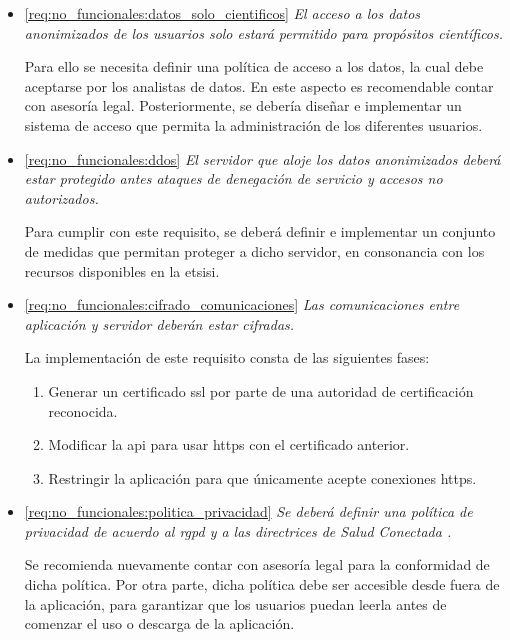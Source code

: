     \begin{itemize}
        \item \ref{req:no_funcionales:datos_solo_cientificos} \textit{El acceso a los datos anonimizados de los usuarios solo estará permitido para propósitos científicos.}
        
        Para ello se necesita definir una política de acceso a los datos, la cual debe aceptarse por los analistas de datos. En este aspecto es recomendable contar con asesoría legal. Posteriormente, se debería diseñar e implementar un sistema de acceso que permita la administración de los diferentes usuarios.
        
        \item \ref{req:no_funcionales:ddos} \textit{El servidor que aloje los datos anonimizados deberá estar protegido antes ataques de denegación de servicio y accesos no autorizados.}

        Para cumplir con este requisito, se deberá definir e implementar un conjunto de medidas que permitan proteger a dicho servidor, en consonancia con los recursos disponibles en la \gls{etsisi}.
        
        \item \ref{req:no_funcionales:cifrado_comunicaciones} \textit{Las comunicaciones entre aplicación y servidor deberán estar cifradas.}

        La implementación de este requisito consta de las siguientes fases:
        \begin{enumerate}
            \item Generar un certificado \gls{ssl} por parte de una autoridad de certificación reconocida.
            \item Modificar la \gls{api} para usar \gls{https} con el certificado anterior.
            \item Restringir la aplicación para que únicamente acepte conexiones \gls{https}.
        \end{enumerate}
        
        \item \ref{req:no_funcionales:politica_privacidad} \textit{Se deberá definir una política de privacidad de acuerdo al \gls{rgpd} \cite{publications_office_of_the_european_union_reglamento_nodate} y a las directrices de \textit{Salud Conectada} \cite{google_preguntas_nodate}.}

        Se recomienda nuevamente contar con asesoría legal para la conformidad de dicha política. Por otra parte, dicha política debe ser accesible desde fuera de la aplicación, para garantizar que los usuarios puedan leerla antes de comenzar el uso o descarga de la aplicación. 
    \end{itemize}

